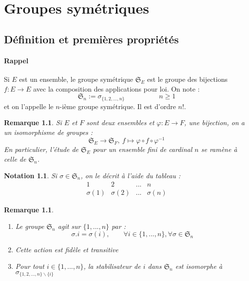 \documentclass[a4paper, oneside]{report}
\theoremstyle{break}
\newtheorem{nota}[thm]{Notation}
\newtheorem{remar}[thm]{Remarque}
\renewcommand{\S}{\mathfrak{S}}
\begin{document}
\chapter{Groupes symétriques}

\section{Définition et premières propriétés}

\subsubsection{Rappel}
Si $E$ est un ensemble, le groupe symétrique $\S_E$ est le groupe des bijections $f:E\rightarrow E$ avec la composition des applications pour loi. On note :
$$\S_n := \sigma_{\{1,2,...,n \}} \hspace{5em} n\geq 1$$
et on l'appelle le $n$-ième groupe symétrique. Il est d'ordre $n!$.

\begin{remar}
	Si $E$ et $F$ sont deux ensembles et $\varphi:E\rightarrow F$, une bijection, on a un isomorphisme de groupes :
	$$\S_E \rightarrow \S_F,~f\mapsto \varphi\circ f \circ \varphi^{-1}$$
	En particulier, l'étude de $\S_E$ pour un ensemble fini de cardinal $n$ se ramène à celle de $\S_n$.
\end{remar}

\begin{nota}
	Si $\sigma\in \S_n$, on le décrit à l'aide du tableau :
	$$\begin{array}{llll}
	1&2&...&n\\
	\sigma(1)&\sigma(2)&...&\sigma(n)
	\end{array}$$
\end{nota}

\begin{remar}
	\begin{enumerate}
		\item Le groupe $\S_n$ agit sur $\{1,...,n\}$ par :
		$$\sigma.i=\sigma(i), \hspace{2em} \forall i\in \{1,...,n\}, \forall \sigma \in \S_n$$
		
		\item Cette action est fidèle et transitive
		
		\item Pour tout $i\in \{1,...,n\}$, la stabilisateur de $i$ dans $\S_n$ est isomorphe à $\sigma_{\{1,2,...,n \}\backslash \{i\}}$
	\end{enumerate}
\end{remar}
\end{document}
